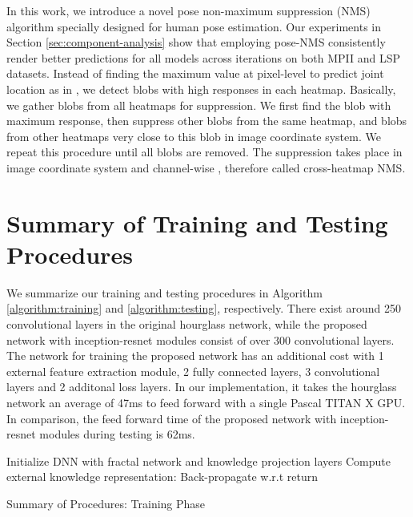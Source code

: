 \documentclass[journal ]{IEEEtran}
\begin{document}
In this work, we introduce a novel pose non-maximum suppression (NMS) algorithm specially designed for human pose estimation.
Our experiments in Section \ref{sec:component-analysis} show that employing pose-NMS consistently render better predictions for all models across iterations on both MPII \cite{andriluka20142d} and LSP \cite{johnson2010clustered} datasets.
Instead of finding the maximum value at pixel-level to predict joint location as in \cite{newell2016stacked, belagiannis2016recurrent, wei2016convolutional, bulat2016human}, we detect blobs with high responses in each heatmap. Basically, we gather blobs from all heatmaps for suppression. We first find the blob with maximum response, then suppress other blobs from the same heatmap, and blobs from other heatmaps very close to this blob in image coordinate system. We repeat this procedure until all blobs are removed. The suppression takes place in image coordinate system and channel-wise , therefore called cross-heatmap NMS. 


\section{Summary of Training and Testing Procedures}

We summarize our training and testing procedures in Algorithm \ref{algorithm:training} and \ref{algorithm:testing}, respectively. 
There exist around 250 convolutional layers in the original hourglass network, while the proposed network with inception-resnet modules consist of over 300 convolutional layers. The network for training the proposed network has an additional cost with 1 external feature extraction module, 2 fully connected layers, 3 convolutional layers and 2 additonal loss layers. In our implementation, it takes the hourglass network  an average of 47ms to feed forward with a single Pascal TITAN X GPU. In comparison, the feed forward time of the proposed network with inception-resnet modules during testing is 62ms.


\begin{algorithm}[h]
	\SetAlgoLined
	
    
   
    
	Initialize DNN with fractal network and knowledge projection layers\;
	{
		{
			Compute external knowledge representation:  \;
Back-propagate w.r.t  \;
		 \;
	    }
	}
    return 
    
    
\caption{Summary of Procedures: Training Phase}
\label{algorithm:training}
\end{algorithm}
\end{document}
